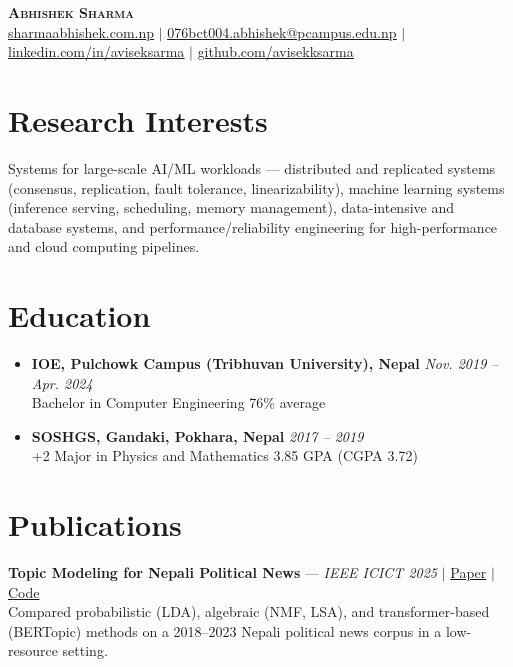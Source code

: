\documentclass[letterpaper,11pt]{article}
\begin{document}
\begin{center}
    \textbf{\Huge \scshape Abhishek Sharma} \\ \vspace{5pt}
    \small \href{https://sharmaabhishek.com.np/}{\underline{sharmaabhishek.com.np}} $|$
    \href{mailto:076bct004.abhishek@pcampus.edu.np}{\underline{076bct004.abhishek@pcampus.edu.np}} $|$
    \href{https://www.linkedin.com/in/aviseksarma/}{\underline{linkedin.com/in/aviseksarma}} $|$
    \href{https://github.com/avisekksarma}{\underline{github.com/avisekksarma}}
\end{center}

\section{Research Interests}
 \begin{itemize}[leftmargin=0.15in, label={}, itemsep=1pt, parsep=0pt, topsep=1pt]
    \small{\item{
    Systems for large-scale AI/ML workloads --- distributed and replicated systems (consensus, replication, fault tolerance, linearizability), machine learning systems (inference serving, scheduling, memory management), data-intensive and database systems, and performance/reliability engineering for high-performance and cloud computing pipelines.
    }}
 \end{itemize}

\section{Education}
\begin{itemize}[leftmargin=0.15in, itemsep=3pt, parsep=0pt, topsep=2pt]
    \item \textbf{IOE, Pulchowk Campus (Tribhuvan University), Nepal} \hfill \textit{Nov. 2019 -- Apr. 2024} \\
    Bachelor in Computer Engineering \hfill 76\% average
    \item \textbf{SOSHGS, Gandaki, Pokhara, Nepal} \hfill \textit{2017 -- 2019} \\
    +2 Major in Physics and Mathematics \hfill 3.85 GPA (CGPA 3.72)
\end{itemize}

\section{Publications}
 \begin{itemize}[leftmargin=0.15in, label={}, itemsep=1pt, parsep=0pt, topsep=1pt]
    \small{\item{
     \textbf{Topic Modeling for Nepali Political News} --- \textit{IEEE ICICT 2025} $|$ \href{https://doi.org/10.1109/ICICT64420.2025.11004776}{Paper} $|$ \href{https://github.com/adh-aashish/topic_modeling}{Code} \\
     Compared probabilistic (LDA), algebraic (NMF, LSA), and transformer-based (BERTopic) methods on a 2018--2023 Nepali political news corpus in a low-resource setting.
    }}
 \end{itemize}
\end{document}
